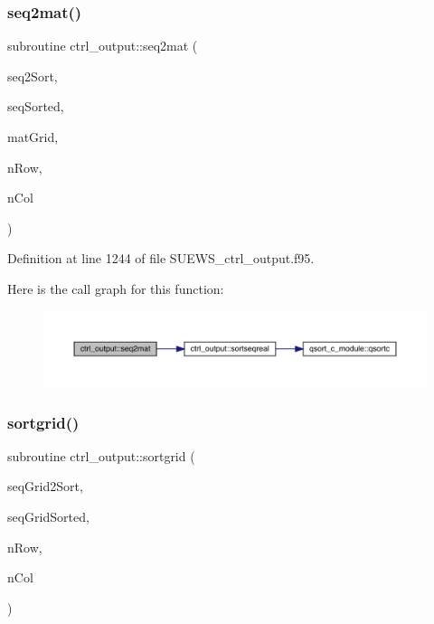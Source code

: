 \subsubsection{\texorpdfstring{seq2mat()}{seq2mat()}}
{\footnotesize\ttfamily subroutine ctrl\+\_\+output\+::seq2mat (\begin{DoxyParamCaption}\item[{real(kind(1d0)), dimension(nrow$\ast$ncol)}]{seq2\+Sort,  }\item[{real(kind(1d0)), dimension(nrow$\ast$ncol)}]{seq\+Sorted,  }\item[{real(kind(1d0)), dimension(nrow,ncol)}]{mat\+Grid,  }\item[{integer}]{n\+Row,  }\item[{integer}]{n\+Col }\end{DoxyParamCaption})}



Definition at line 1244 of file S\+U\+E\+W\+S\+\_\+ctrl\+\_\+output.\+f95.

Here is the call graph for this function\+:\nopagebreak
\begin{figure}[H]
\begin{center}
\leavevmode
\includegraphics[width=350pt]{namespacectrl__output_a06abc3039b8c610cb65b9cd42817d064_cgraph}
\end{center}
\end{figure}
\mbox{\label{namespacectrl__output_a1807dd1d886e5fd090461e140156758b}} 
\subsubsection{\texorpdfstring{sortgrid()}{sortgrid()}}
{\footnotesize\ttfamily subroutine ctrl\+\_\+output\+::sortgrid (\begin{DoxyParamCaption}\item[{integer, dimension(nrow$\ast$ncol), intent(in)}]{seq\+Grid2\+Sort,  }\item[{integer, dimension(nrow$\ast$ncol), intent(out)}]{seq\+Grid\+Sorted,  }\item[{integer}]{n\+Row,  }\item[{integer}]{n\+Col }\end{DoxyParamCaption})}



